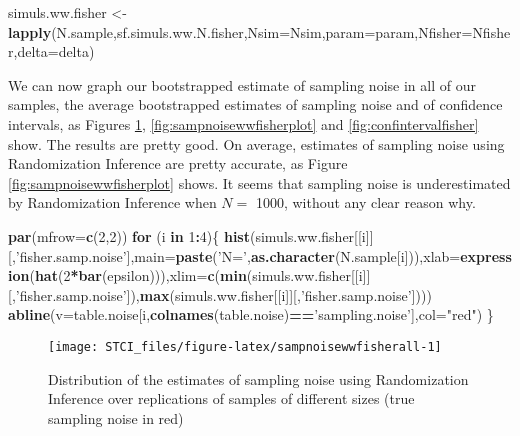 \documentclass[]{book}
\newenvironment{Shaded}{\begin{snugshade}}{\end{snugshade}}
\newcommand{\KeywordTok}[1]{\textcolor[rgb]{0.13,0.29,0.53}{\textbf{#1}}}
\newcommand{\DataTypeTok}[1]{\textcolor[rgb]{0.13,0.29,0.53}{#1}}
\newcommand{\DecValTok}[1]{\textcolor[rgb]{0.00,0.00,0.81}{#1}}
\newcommand{\StringTok}[1]{\textcolor[rgb]{0.31,0.60,0.02}{#1}}
\newcommand{\ControlFlowTok}[1]{\textcolor[rgb]{0.13,0.29,0.53}{\textbf{#1}}}
\newcommand{\OperatorTok}[1]{\textcolor[rgb]{0.81,0.36,0.00}{\textbf{#1}}}
\newcommand{\NormalTok}[1]{#1}
\theoremstyle{definition}
\theoremstyle{definition}
\theoremstyle{definition}
\theoremstyle{remark}
\begin{document}
\begin{Shaded}
\begin{Highlighting}[]
\NormalTok{simuls.ww.fisher <-}\StringTok{ }\KeywordTok{lapply}\NormalTok{(N.sample,sf.simuls.ww.N.fisher,}\DataTypeTok{Nsim=}\NormalTok{Nsim,}\DataTypeTok{param=}\NormalTok{param,}\DataTypeTok{Nfisher=}\NormalTok{Nfisher,}\DataTypeTok{delta=}\NormalTok{delta)}
\end{Highlighting}
\end{Shaded}

We can now graph our bootstrapped estimate of sampling noise in all of
our samples, the average bootstrapped estimates of sampling noise and of
confidence intervals, as Figures \ref{fig:sampnoisewwfisherall},
\ref{fig:sampnoisewwfisherplot} and \ref{fig:confintervalfisher} show.
The results are pretty good. On average, estimates of sampling noise
using Randomization Inference are pretty accurate, as Figure
\ref{fig:sampnoisewwfisherplot} shows. It seems that sampling noise is
underestimated by Randomization Inference when \(N=\) 1000, without any
clear reason why.

\begin{Shaded}
\begin{Highlighting}[]
\KeywordTok{par}\NormalTok{(}\DataTypeTok{mfrow=}\KeywordTok{c}\NormalTok{(}\DecValTok{2}\NormalTok{,}\DecValTok{2}\NormalTok{))}
\ControlFlowTok{for}\NormalTok{ (i }\ControlFlowTok{in} \DecValTok{1}\OperatorTok{:}\DecValTok{4}\NormalTok{)\{}
  \KeywordTok{hist}\NormalTok{(simuls.ww.fisher[[i]][,}\StringTok{'fisher.samp.noise'}\NormalTok{],}\DataTypeTok{main=}\KeywordTok{paste}\NormalTok{(}\StringTok{'N='}\NormalTok{,}\KeywordTok{as.character}\NormalTok{(N.sample[i])),}\DataTypeTok{xlab=}\KeywordTok{expression}\NormalTok{(}\KeywordTok{hat}\NormalTok{(}\DecValTok{2}\OperatorTok{*}\KeywordTok{bar}\NormalTok{(epsilon))),}\DataTypeTok{xlim=}\KeywordTok{c}\NormalTok{(}\KeywordTok{min}\NormalTok{(simuls.ww.fisher[[i]][,}\StringTok{'fisher.samp.noise'}\NormalTok{]),}\KeywordTok{max}\NormalTok{(simuls.ww.fisher[[i]][,}\StringTok{'fisher.samp.noise'}\NormalTok{])))}
  \KeywordTok{abline}\NormalTok{(}\DataTypeTok{v=}\NormalTok{table.noise[i,}\KeywordTok{colnames}\NormalTok{(table.noise)}\OperatorTok{==}\StringTok{'sampling.noise'}\NormalTok{],}\DataTypeTok{col=}\StringTok{"red"}\NormalTok{)}
\NormalTok{\}}
\end{Highlighting}
\end{Shaded}

\begin{figure}[htbp]

{\centering \texttt{[image: STCI\_files/figure-latex/sampnoisewwfisherall-1]} 

}

\caption{Distribution of the estimates of sampling noise using Randomization Inference over replications of samples of different sizes (true sampling noise in red)}\label{fig:sampnoisewwfisherall}
\end{figure}
\end{document}
